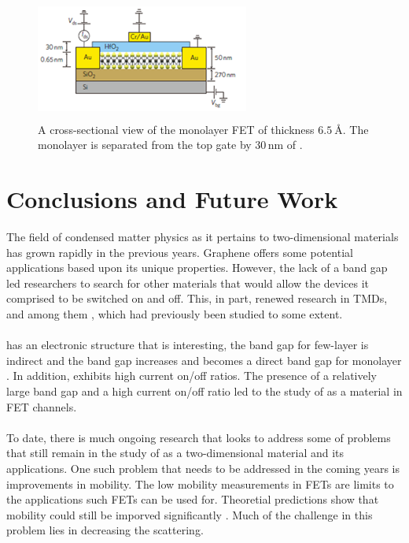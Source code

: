 \documentclass[%
 reprint,
 amsmath,amssymb,
 aps,
pra,
floatfix,
]{revtex4-1}
\begin{document}
\begin{figure}
\includegraphics[width=7cm, height=4cm]{../figs/mos2fetSchematic}
\caption{A cross-sectional view of the monolayer  FET of thickness $\SI{6.5}{\angstrom}$. The monolayer is separated from the top gate by $30\mathrm{\,nm}$ of  \cite{grapheneLike2Dreview2013}.}
\label{fig:mos2fetSchematic}
\end{figure}

\section{\label{sec:problems_and_outlook} Conclusions and Future Work}
The field of condensed matter physics as it pertains to two-dimensional materials has grown rapidly in the previous years. Graphene offers some potential applications based upon its unique properties. However, the lack of a band gap led researchers to search for other materials that would allow the devices it comprised to be switched on and off. This, in part, renewed research in TMDs, and among them , which had previously been studied to some extent. \\ \\
 has an electronic structure that is interesting, the band gap for few-layer  is indirect and the band gap increases and becomes a direct band gap for monolayer . In addition,  exhibits high current on/off ratios. The presence of a relatively large band gap and a high current on/off ratio led to the study of  as a material in FET channels. \\ \\
To date, there is much ongoing research that looks to address some of problems that still remain in the study of  as a two-dimensional material and its applications. One such problem that needs to be addressed in the coming years is improvements in mobility. The low mobility measurements in  FETs are limits to the applications such FETs can be used for. Theoretial predictions show that mobility could still be imporved significantly \cite{Kaasbjerg2013}. Much of the challenge in this problem lies in decreasing the scattering. 



\end{document}
